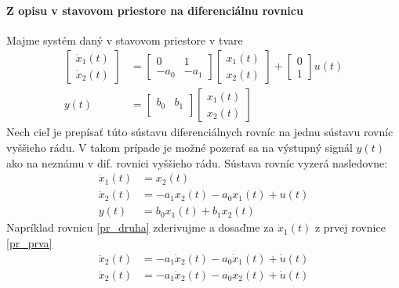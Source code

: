 \documentclass[a4paper, 10pt, ]{article}
\begin{document}
\paragraph{Z opisu v stavovom priestore na diferenciálnu rovnicu}

Majme systém daný v stavovom priestore v tvare
\begin{align}
	\begin{bmatrix}
    	  \dot x_1(t) \\
		  \dot x_2(t)
 	\end{bmatrix}
	&=
	\begin{bmatrix}
    	0 & 1 \\
    	- a_0 & - a_1
  	\end{bmatrix}
    \begin{bmatrix}
    	  x_1(t) \\
		  x_2(t)
 	\end{bmatrix}
    +
    \begin{bmatrix}
    	  0 \\
		  1
 	\end{bmatrix}
    u(t)
    \\
    y(t)
    &=
    \begin{bmatrix}
        b_0 & b_1 \\
    \end{bmatrix}
    \begin{bmatrix}
          x_1(t) \\
          x_2(t)
    \end{bmatrix}
\end{align}
Nech cieľ je prepísať túto sústavu diferenciálnych rovníc na jednu sústavu rovníc vyššieho rádu. V takom prípade je možné pozerať sa na výstupný signál $y(t)$ ako na neznámu v dif. rovnici vyššieho rádu. Sústava rovníc vyzerá nasledovne:
\begin{align}
    \dot x_1(t) &= x_2(t) \label{pr_prva}\\
    \dot x_2(t) &= - a_1 x_2(t) - a_0 x_1(t) + u(t) \label{pr_druha}\\
    y(t) &= b_0 x_1(t) + b_1 x_2(t) \label{pr_tretia}
\end{align}
Napríklad rovnicu \eqref{pr_druha} zderivujme a dosaďme za $\dot x_1(t)$ z prvej rovnice \eqref{pr_prva}
\begin{align}
    \ddot x_2(t) &= - a_1 \dot x_2(t) - a_0 \dot x_1(t) + \dot u(t) \\
    \ddot x_2(t) &= - a_1 \dot x_2(t) - a_0 x_2(t) + \dot u(t) \label{92}
\end{align}
\end{document}
